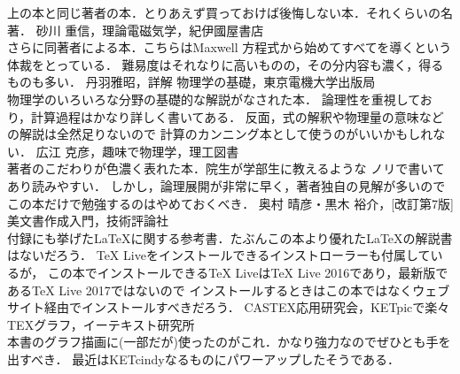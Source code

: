 \begin{thebibliography}{99}
上の本と同じ著者の本．とりあえず買っておけば後悔しない本．それくらいの名著．
   砂川 重信，理論電磁気学，紀伊國屋書店 \\
さらに同著者による本．こちらはMaxwell
方程式から始めてすべてを導くという体裁をとっている．
難易度はそれなりに高いものの，その分内容も濃く，得るものも多い．
  丹羽雅昭，詳解 物理学の基礎，東京電機大学出版局 \\
物理学のいろいろな分野の基礎的な解説がなされた本．
論理性を重視しており，計算過程はかなり詳しく書いてある．
反面，式の解釈や物理量の意味などの解説は全然足りないので
計算のカンニング本として使うのがいいかもしれない．
  広江 克彦，趣味で物理学，理工図書 \\
著者のこだわりが色濃く表れた本．院生が学部生に教えるような
ノリで書いてあり読みやすい．
しかし，論理展開が非常に早く，著者独自の見解が多いのでこの本だけで勉強するのはやめておくべき．
  奥村 晴彦・黒木 裕介，[改訂第7版] {\LaTeXe}美文書作成入門，技術評論社 \\
付録にも挙げた{\LaTeX}に関する参考書．たぶんこの本より優れた{\LaTeX}の解説書はないだろう．
TeX Liveをインストールできるインストローラーも付属しているが，
この本でインストールできるTeX LiveはTeX Live 2016であり，最新版であるTeX Live 2017ではないので
インストールするときはこの本ではなくウェブサイト経由でインストールすべきだろう．
  CASTEX応用研究会，KETpicで楽々TEXグラフ，イーテキスト研究所 \\
 本書のグラフ描画に(一部だが)使ったのがこれ．かなり強力なのでぜひとも手を出すべき．
 最近はKETcindyなるものにパワーアップしたそうである．
\end{thebibliography}